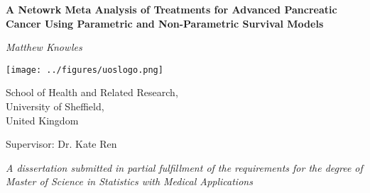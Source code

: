 \begin{titlepage}

    \begin{center}

        \vspace*{1.5cm}

        \textbf{\huge A Netowrk Meta Analysis of Treatments for Advanced Pancreatic Cancer Using Parametric and Non-Parametric Survival Models} 
        
        \vspace*{1.5cm}
        
        \textit{Matthew Knowles}

        \vspace*{1.5cm}
    
        \texttt{[image: ../figures/uoslogo.png]}
        
        \vspace*{1.5cm}
        
        School of Health and Related Research, \\
        University of Sheffield, \\
        United Kingdom \\

        \vspace*{0.5cm}

        Supervisor: Dr. Kate Ren
        
        \vspace*{1.5cm}

        \textit{A dissertation submitted in partial fulfillment of the requirements for the degree of Master of Science in 
        Statistics with Medical Applications}
    \end{center}
    
\end{titlepage}
